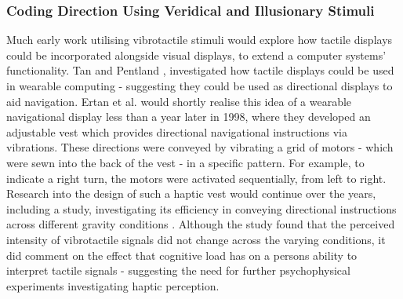 \documentclass{interim}
\begin{document}
\subsubsection{Coding Direction Using Veridical and Illusionary Stimuli}
Much early work utilising vibrotactile stimuli would explore how tactile displays could be incorporated alongside visual displays, to extend a computer systems’ functionality. Tan and Pentland \cite{629923}, investigated how tactile displays could be used in wearable computing - suggesting they could be used as directional displays to aid navigation. Ertan et al. \cite{729547} would shortly realise this idea of a wearable navigational display less than a year later in 1998, where they developed an adjustable vest which provides directional navigational instructions via vibrations. These directions were conveyed by vibrating a grid of motors - which were sewn into the back of the vest - in a specific pattern. For example, to indicate a right turn, the motors were activated sequentially, from left to right. Research into the design of such a haptic vest would continue over the years, including a study, investigating its efficiency in conveying directional instructions across different gravity conditions \cite{998954}. Although the study found that the perceived intensity of vibrotactile signals did not change across the varying conditions, it did comment on the effect that cognitive load has on a persons ability to interpret tactile signals - suggesting the need for further psychophysical experiments investigating haptic perception.
\end{document}
